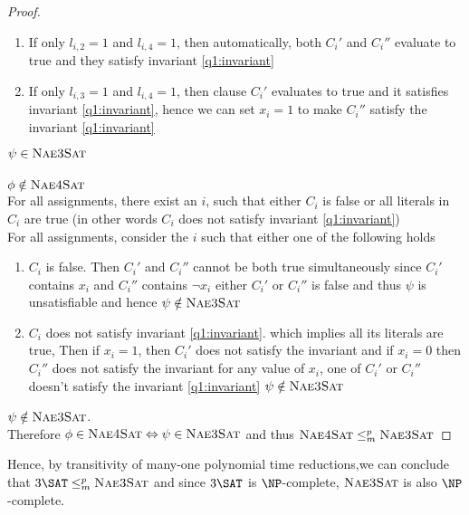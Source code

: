 \begin{proof}
\begin{enumerate}
\begin{enumerate}
            \item If only $l_{i, 2} = 1$ and $l_{i, 4} = 1$, then automatically, both $C_i'$ and $C_i''$ evaluate to true and they satisfy invariant \ref{q1:invariant}
            \item If only $l_{i, 3} = 1$ and $l_{i, 4} = 1$, then clause $C_i'$ evaluates to true and it satisfies invariant \ref{q1:invariant}, hence we can set $x_i = 1$ to make $C_i''$ satisfy the invariant \ref{q1:invariant}
        \end{enumerate}
    \end{enumerate}
    \imp $\psi \in \textsc{Nae3Sat}$
\\\\
    $\phi \notin \textsc{Nae4Sat}$\\
    \imp
    For all assignments, there exist an $i$, such that either $C_i$ is false or all literals in $C_i$ are true (in other words $C_i$ does not satisfy invariant \ref{q1:invariant})\\
    \imp For all assignments, consider the $i$ such that either one of the following holds
    \begin{enumerate}
        \item $C_i$ is false. Then $C_i'$ and $C_i''$ cannot be both true simultaneously since $C_i'$ contains $x_i$ and $C_i''$ contains $\neg x_i$ \imp either $C_i'$ or $C_i''$ is false and thus $\psi$ is unsatisfiable and hence $\psi \notin \textsc{Nae3Sat}$
        \item $C_i$ does not satisfy invariant \ref{q1:invariant}. which implies all its literals are true, Then if $x_i = 1$, then $C_i'$ does not satisfy the invariant and if $x_i = 0$ then $C_i''$ does not satisfy the invariant \imp for any value of $x_i$, one of $C_i'$ or $C_i''$ doesn't satisfy the invariant \ref{q1:invariant} \imp
        $\psi \notin \textsc{Nae3Sat}$
    \end{enumerate}
    \imp $\psi \notin \textsc{Nae3Sat}$.\\
    Therefore $\phi \in \textsc{Nae4Sat} \Leftrightarrow \psi \in \textsc{Nae3Sat}$ and thus $\textsc{Nae4Sat} \leq_m^p \textsc{Nae3Sat}$
\end{proof}

Hence, by transitivity of many-one polynomial time reductions,we can conclude that $3\SAT \leq_m^p \naetsat$ and since $3\SAT$ is $\NP$-complete, $\textsc{Nae3Sat}$ is also $\NP$-complete.


